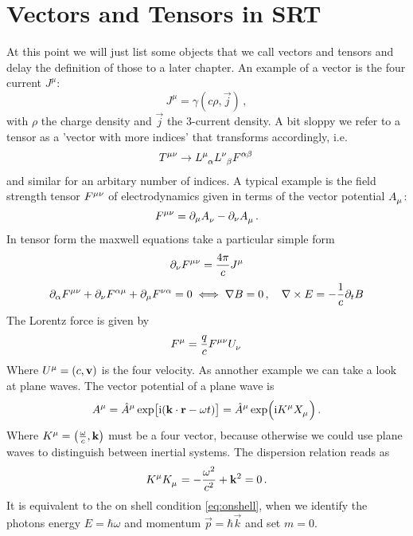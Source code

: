 \section{Vectors and Tensors in SRT} 
At this point we will just list some objects that we call vectors and tensors
and delay the definition of those to a later chapter.
An example of a vector is the four current $J^\mu$:
\begin{equation}
J^\mu=\gamma(c\rho,\vec{j})\, ,
\end{equation}
with $\rho$ the charge density and $\vec{j}$ the 3-current density. A bit sloppy
we refer to a tensor as a 'vector with more indices' that transforms
accordingly, i.e.
\begin{equation}
\tensor{T}{^\mu^\nu}\to
\tensor{L}{^\mu_\alpha}\tensor{L}{^\nu_\beta}\tensor{F}{^\alpha^\beta}\, 
\end{equation}
and similar for an arbitary number of indices. A typical example is the field
strength tensor $\tensor{F}{^\mu^\nu}$ of electrodynamics given in terms of the
vector potential $\tensor{A}{_\mu}$:
\begin{equation}
\tensor{F}{^\mu^\nu}=\partial_\mu\tensor{A}{_\nu}-\partial_\nu\tensor{A}{_\mu}\,
.
\end{equation}
In tensor form the maxwell equations take a particular simple form
\begin{equation}
\partial_\nu\tensor{F}{^\mu^\nu}=\frac{4\pi}{c}\tensor{J}{^\mu}
\end{equation}
\begin{equation}
\partial_\alpha\tensor{F}{^\mu^\nu}
+\partial_\nu\tensor{F}{^\alpha^\mu}
+\partial_\mu\tensor{F}{^\nu^\alpha}=0
\iff \nabla B=0\, , \quad \nabla\times E=-\frac{1}{c}\partial_t B
\end{equation}
The Lorentz force is given by
\begin{equation}
\tensor{F}{^\mu}=\frac{q}{c}\tensor{F}{^\mu^\nu}\tensor{U}{_\nu}
\end{equation} 
Where $\tensor{U}{^\mu}=(c,\vec{v})$ is the four velocity. As annother example
we can take a look at plane waves. The vector potential of a plane wave is
\begin{equation}
\tensor{A}{^\mu}=\tensor{\hat{A}}{^\mu}
\exp\left[\imI(\vec{k}\cdot\vec{r}-\omega
t)\right]
=\tensor{\hat{A}}{^\mu}\exp\left(\imI\tensor{K}{^\mu} \tensor{X}{_\mu}\right)\,
.
\end{equation}
Where $\tensor{K}{^\mu}=\left(\frac{\omega}{c},\vec{k}\right)$ must be a four
vector, because otherwise we could use plane waves to distinguish between
inertial systems. The dispersion relation reads as
\begin{equation}
\tensor{K}{^\mu}\tensor{K}{_\mu}=-\frac{\omega^2}{c^2}+\vec{k}^2=0\, .
\end{equation}
It is equivalent to the on shell condition \eqref{eq:onshell}, when we identify
the photons energy $E=\hbar\omega$ and momentum $\vec{p}=\hbar\vec{k}$ and set
$m=0$.
